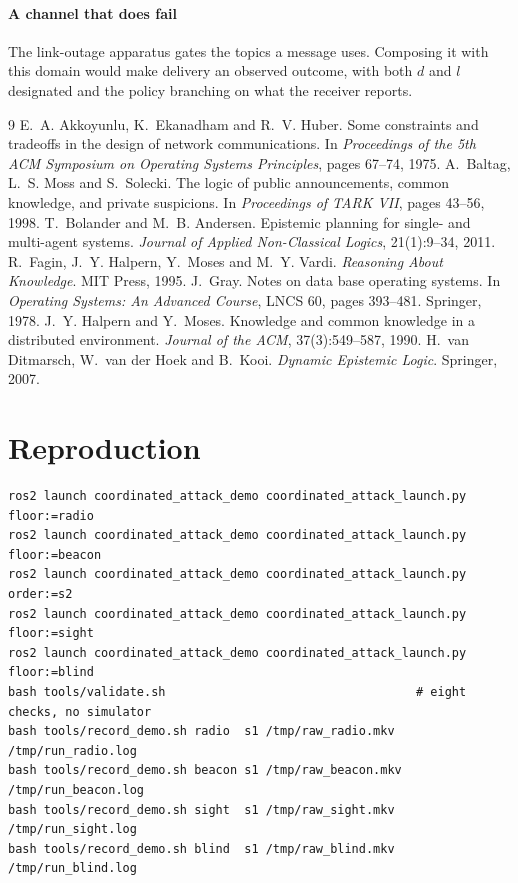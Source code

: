 \documentclass[11pt,a4paper]{article}
\theoremstyle{definition}
\begin{document}
\paragraph{A channel that does fail} The link-outage apparatus gates the topics
a message uses. Composing it with this domain would make delivery an observed
outcome, with both $d$ and $l$ designated and the policy branching on what the
receiver reports.

\begin{thebibliography}{9}
 E.~A. Akkoyunlu, K.~Ekanadham and R.~V. Huber.
  Some constraints and tradeoffs in the design of network communications.
  In \emph{Proceedings of the 5th ACM Symposium on Operating Systems
  Principles}, pages 67--74, 1975.
 A.~Baltag, L.~S. Moss and S.~Solecki.
  The logic of public announcements, common knowledge, and private suspicions.
  In \emph{Proceedings of TARK VII}, pages 43--56, 1998.
 T.~Bolander and M.~B. Andersen.
  Epistemic planning for single- and multi-agent systems.
  \emph{Journal of Applied Non-Classical Logics}, 21(1):9--34, 2011.
 R.~Fagin, J.~Y. Halpern, Y.~Moses and M.~Y. Vardi.
  \emph{Reasoning About Knowledge}. MIT Press, 1995.
 J.~Gray.
  Notes on data base operating systems.
  In \emph{Operating Systems: An Advanced Course}, LNCS 60, pages 393--481.
  Springer, 1978.
 J.~Y. Halpern and Y.~Moses.
  Knowledge and common knowledge in a distributed environment.
  \emph{Journal of the ACM}, 37(3):549--587, 1990.
 H.~van Ditmarsch, W.~van der Hoek and B.~Kooi.
  \emph{Dynamic Epistemic Logic}. Springer, 2007.
\end{thebibliography}

\section*{Reproduction}

\begin{lstlisting}
ros2 launch coordinated_attack_demo coordinated_attack_launch.py floor:=radio
ros2 launch coordinated_attack_demo coordinated_attack_launch.py floor:=beacon
ros2 launch coordinated_attack_demo coordinated_attack_launch.py order:=s2
ros2 launch coordinated_attack_demo coordinated_attack_launch.py floor:=sight
ros2 launch coordinated_attack_demo coordinated_attack_launch.py floor:=blind
bash tools/validate.sh                                   # eight checks, no simulator
bash tools/record_demo.sh radio  s1 /tmp/raw_radio.mkv  /tmp/run_radio.log
bash tools/record_demo.sh beacon s1 /tmp/raw_beacon.mkv /tmp/run_beacon.log
bash tools/record_demo.sh sight  s1 /tmp/raw_sight.mkv  /tmp/run_sight.log
bash tools/record_demo.sh blind  s1 /tmp/raw_blind.mkv  /tmp/run_blind.log
\end{lstlisting}
\end{document}
